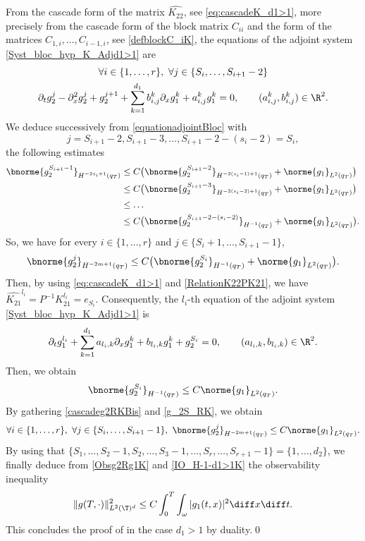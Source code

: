 From the cascade form of the matrix $\widehat{K_{22}}$, see \eqref{eq:cascadeK_d1>1}, more precisely from the cascade form of the block matrix $C_{ii}$ and the form of the matrices $C_{1,i}, \dots, C_{i-1,i}$, see \eqref{defblockC_iK}, the equations of the adjoint system \eqref{Syst_bloc_hyp_K_Adjd1>1} are
\begin{multline}
\label{equationadjointBloc}
\forall i \in \{1, \dots, r\},\ \forall j \in \{S_i, \dots, S_{i+1}-2\}\\
\partial_t g_2^{j} - \partial_x^2 g_2^{j} + g_2^{j+1} + \sum_{k=1}^{d_1} b_{i,j}^k \partial_x g_1^k + a_{i,j}^k g_1^k =0,\qquad (a_{i,j}^k,b_{i,j}^k) \in \R^2.
\end{multline}
We deduce successively from \eqref{equationadjointBloc} with
\[
j=S_{i+1}-2, S_{i+1}-3, \dots, S_{i+1}-2-(s_{i}-2) = S_i,
\]
the following estimates
\begin{align*}
\bnorme{g_2^{S_{i+1}-1}}_{H^{-2s_i+1}(q_T)} & \leq C \bigl(\bnorme{g_2^{S_{i+1}-2}}_{H^{-2(s_i-1)+1}(q_T)} + \norme{g_1}_{L^2(q_T)}\bigr)\notag\\
& \leq C \bigl(\bnorme{g_2^{S_{i+1}-3}}_{H^{-2(s_i-2)+1}(q_T)} + \norme{g_1}_{L^2(q_T)}\bigr) \notag\\
& \leq \dots\label{cascadeg2RK}\\
& \leq C \bigl(\bnorme{g_2^{S_{i+1} -2 -(s_i-2)}}_{H^{-1}(q_T)} + \norme{g_1}_{L^2(q_T)}\bigr). \notag
\end{align*}
So, we have for every $i \in \{1, \dots, r\}$ and $j \in \{S_i+1, \dots, S_{i+1}-1\}$,
\begin{equation}
\label{cascadeg2RKBis}
\bnorme{g_2^{j}}_{H^{-2m+1}(q_T)} \leq C\bigl(\bnorme{g_2^{S_i}}_{H^{-1}(q_T)} + \norme{g_1}_{L^2(q_T)}\bigr).
\end{equation}
Then, by using \eqref{eq:cascadeK_d1>1} and \eqref{RelationK22PK21}, we have $\widehat{K_{21}}^{l_i}=P^{-1} K_{21}^{l_i} = e_{S_i}$. Consequently, the $l_i$-th equation of the adjoint system \eqref{Syst_bloc_hyp_K_Adjd1>1} is
\begin{equation*}
\partial_t g_1^{l_i} + \sum_{k=1}^{d_1} a_{l_i,k} \partial_x g_1^{k} + b_{l_i,k} g_1^{k} + g_2^{S_i} = 0,\qquad (a_{l_i,k}, b_{l_i,k}) \in \R^2.
\end{equation*}
Then, we obtain
\begin{equation}
\label{g_2S_RK}
\bnorme{g_2^{S_i}}_{H^{-1}(q_T)} \leq C \norme{g_1}_{L^2(q_T)}.
\end{equation}
By gathering \eqref{cascadeg2RKBis} and \eqref{g_2S_RK}, we obtain
\begin{equation}
\label{Obsg2Rg1K}
\forall i \in \{1, \dots, r\},\ \forall j \in \{S_i, \dots, S_{i+1}-1\},\ \bnorme{g_2^{j}}_{H^{-2m+1}(q_T)} \leq C \norme{g_1}_{L^2(q_T)}.
\end{equation}
By using that $\{S_1, \dots, S_{2}-1, S_2, \dots, S_{3}-1, \dots, S_{r}, \dots, S_{r+1}-1\} = \{1, \dots, d_2\}$, we finally deduce from \eqref{Obsg2Rg1K} and \eqref{IO_H-1-d1>1K}
the observability inequality\[
\| g(T,\cdot) \|_{L^2(\T)^{d}}^2 \leq C \int_0^T \int_{\omega} |g_1(t,x)|^2 \diff x \diff t.
\]
This concludes the proof of  in the case $d_1>1$ by duality.\qed
\Changelback

